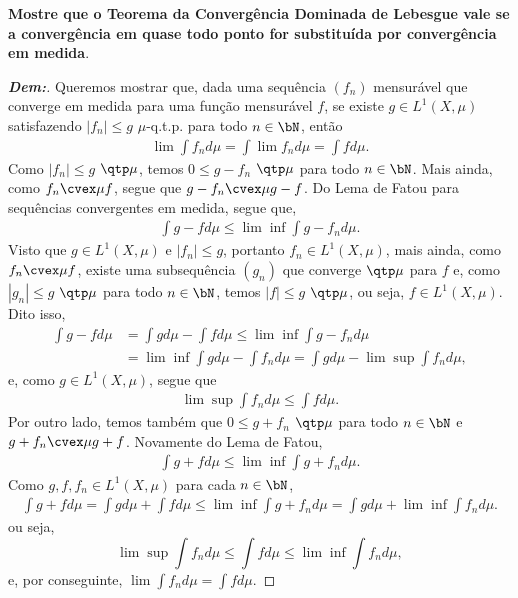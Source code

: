 \textbf{Mostre que o Teorema da Convergência Dominada de Lebesgue vale se 
a convergência em quase todo ponto for substituída por convergência em medida}. 
\begin{proof}[\textbf{Dem:}] Queremos mostrar que, dada uma sequência $(f_n)$ 
  mensurável que converge em medida para uma função mensurável $f$, se existe 
  $g \in L^1(X, \mu)$ satisfazendo $|f_n| \le g$ $\mu$-q.t.p. para todo $n \in \bN$, então 
  \begin{align*}
    \lim \int f_n d\mu = \int \lim f_n d\mu = \int f d\mu.
  \end{align*}
  Como $|f_n| \le g$ $\qtp \mu$, temos $0\le g - f_n$ $\qtp \mu$ para todo $n \in \bN$.
  Mais ainda, como $f_n \cvex \mu f$, segue que $g - f_n\cvex \mu g- f$. 
  Do Lema de Fatou para sequências convergentes em medida, segue que, 
  \begin{align*}
    \int g - f d\mu \le \lim \inf \int g- f_n  d\mu.
  \end{align*}
  Visto que $g \in L^1(X, \mu)$ e $|f_n| \le g$, portanto $f_n \in L^1(X, \mu)$, 
  mais ainda, como $f_n \cvex \mu f$, existe uma subsequência $(g_n)$ que converge 
  $\qtp \mu$ para $f$ e, como $|g_n|\le g$ $\qtp \mu$ para todo $n \in \bN$, 
  temos $|f| \le g$ $\qtp \mu$, ou seja, $f \in L^1(X, \mu)$. 
  Dito isso,
  \begin{align*}
    \int g - f d\mu &= \int g d\mu - \int f d\mu \le \lim \inf \int g -f_n  d\mu\\ 
    &= \lim \inf  \int g d\mu - \int f_n d\mu = \int g d\mu - \lim\sup \int f_n d\mu,
  \end{align*} 
  e, como $g \in L^1(X, \mu)$, segue que 
  \begin{align*}
    \lim\sup \int f_n d\mu \le \int f d\mu.
  \end{align*}
  Por outro lado, temos também que $0 \le g + f_n$ $\qtp \mu$ para todo 
  $n \in \bN$ e $g + f_n \cvex \mu g + f$. 
  Novamente do Lema de Fatou, 
  \begin{align*}
    \int g + f d\mu \le \lim \inf \int g + f_n d\mu.
  \end{align*}
  Como $g, f, f_n \in L^1(X, \mu)$ para cada $n \in \bN$,
  \begin{align*}
    \int g + f d\mu = \int g d\mu + \int f d\mu \le \lim \inf \int g + f_n d\mu = 
    \int g d\mu + \lim \inf \int f_n d\mu.
  \end{align*}
  ou seja, 
  $$\lim \sup \int f_n d\mu \le \int f d\mu \le \lim \inf \int f_n d\mu,$$
  e, por conseguinte, $\lim \int f_n d\mu = \int f d\mu$.
\end{proof}

